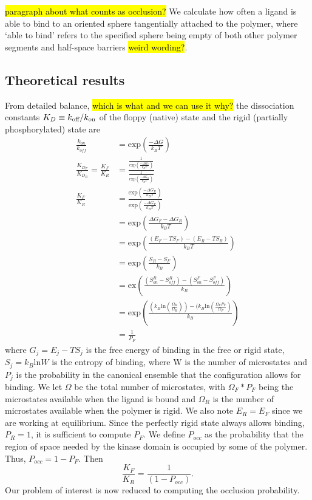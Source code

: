 \documentclass[../AdvancementSummary.tex]{subfiles}
\begin{document}
\hl{paragraph about what counts as occlusion?}
We calculate how often a ligand is able to bind to an oriented sphere tangentially attached to the polymer, where `able to bind' refers to the specified sphere being empty of both other polymer segments and half-space barriers \hl{weird wording?}. 

\subsection{Theoretical results}


From detailed balance, \hl{which is what and we can use it why?} the dissociation constants $K_D \equiv k_{\mbox{\scriptsize off}}/k_{\mbox{\scriptsize on}}$ of the floppy (native) state and the rigid (partially phosphorylated) state are
\begin{align} 
\frac{k_{on}}{k_{off}} &= \mbox{exp} \left( \frac{-\Delta G}{k_B T}\right) \\
\frac{K_{D_F}}{K_{D_R}} = \frac{K_F}{K_R} &= \frac{\frac{1}{\mbox{exp} \left( \frac{-\Delta G_F}{k_B T}\right) }}{\frac{1}{\mbox{exp} \left( \frac{-\Delta G_R}{k_B T}\right)}} \\ 
\frac{K_F}{K_R} &= \frac{\mbox{exp} \left( \frac{-\Delta G_R}{k_B T} \right)}{\mbox{exp} \left( \frac{-\Delta G_F}{k_B T} \right)} \\
&= \mbox{exp} \left(\frac{\Delta G_F-\Delta G_R}{k_B T}\right) \\
&= \mbox{exp} \left( \frac{(E_F-T S_F)-(E_R-T S_R)}{k_B T} \right) \\
&= \mbox{exp} \left(\frac{S_R-S_F}{k_B}\right) \\
&=\mbox{ex}\left(\frac{(S^R_{on}-S^R_{off}) - (S^F_{on}-S^F_{off})}{k_B} \right) \\
&= \mbox{exp} \left( \frac{(k_B \mbox{ln} (\frac{\Omega_R}{\Omega_R}))-(k_B \mbox{ln}(\frac{\Omega_F P_F}{\Omega_F})}{k_B} \right) \\
&= \frac{1}{P_F}
\end{align}  
where $G_j=E_j-TS_j$ is the free energy of binding in the free or rigid state, $S_j = k_B \mbox{ln} W$ is the entropy of binding, where W is the number of microstates and $P_j$ is the probability in the canonical ensemble that the configuration allows for binding. We let $\Omega$ be the total number of microstates, with $\Omega_F * P_F$ being the microstates available when the ligand is bound and $\Omega_R$ is the number of microstates available when the polymer is rigid.  We also note $E_R = E_F$ since we are working at equilibrium. Since the perfectly rigid state always allows binding, $P_R=1$, it is sufficient to compute $P_F$. We define $P_{occ}$ as the probability that the region of space needed by the kinase domain is occupied by some of the polymer. Thus, $P_{occ}=1-P_F$. Then
\begin{equation}
\frac{K_F}{K_R} = \frac{1}{(1-P_{occ})}.
\end{equation}
Our problem of interest is now reduced to computing the occlusion probability. 
\end{document}
